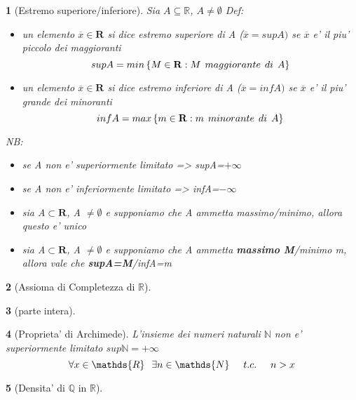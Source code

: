 \documentclass{article}
\theoremstyle{mystyle}
\newtheorem*{mydefinition}{}
\begin{document}
 \begin{mydefinition}[Estremo superiore/inferiore]
          Sia $A\subseteq \mathds{R}$, $A\neq \emptyset$ \newline Def: \begin{itemize}
              \item un elemento $\overline{x} \in \mathbf{R}$ si dice \emph{estremo superiore} di A ($\overline{x}=supA)$ se $\overline{x}$ e' il \emph{piu' piccolo dei maggioranti} $$supA=min \left \{ M \in \mathbf{R}:M \hspace{1.5mm} maggiorante \hspace{1.5mm} di \hspace{1.5mm} A\right \}$$
              
              \item un elemento $\overline{x} \in \mathbf{R}$ si dice \emph{estremo inferiore} di A ($\overline{x}=infA)$ se $\overline{x}$ e' il \emph{piu' grande dei minoranti} $$infA=max \left \{ m \in \mathbf{R}:m \hspace{1.5mm} minorante \hspace{1.5mm} di \hspace{1.5mm} A\right \}$$
          \end{itemize}
          \emph{NB}: \begin{itemize}
              \item se A non e' superiormente limitato => supA=$+\infty$
              \item se A non e' inferiormente limitato => infA=$-\infty$
              \item sia A$\subset \mathbf{R}$, A $\neq \emptyset$ e supponiamo che A ammetta massimo/minimo, allora questo e' unico
              \item sia A$\subset \mathbf{R}$, A $\neq \emptyset$ e supponiamo che A ammetta \textbf{massimo M}/\textit{minimo m}, allora vale che \textbf{supA=M}/\textit{infA=m}
          \end{itemize}
 \end{mydefinition}
 \begin{mydefinition}[Assioma di Completezza di $\mathds{R}$]
     
 \end{mydefinition}
 \begin{mydefinition}[parte intera]
     
 \end{mydefinition}
 \begin{mydefinition}[Proprieta' di Archimede]
     L'insieme dei numeri naturali $\mathds{N}$ non e' superiormente limitato \hspace{2cm} $sup\mathds{N}=+\infty$
     $$\forall x \in \mathds{R} \hspace{2.5mm} \exists n\in \mathds{N} \hspace{5mm} t.c. \hspace{5mm}n>x$$
 \end{mydefinition}
 \begin{mydefinition}[Densita' di $\mathds{Q}$ in $\mathds{R}$]
     
 \end{mydefinition}
\end{document}
